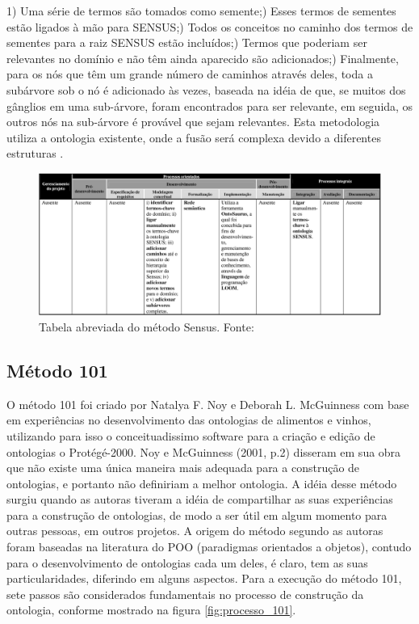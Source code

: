   1) Uma série de termos são tomados como semente;) Esses termos de sementes estão ligados à mão para SENSUS;) Todos os conceitos no caminho dos termos de sementes para a raiz SENSUS estão incluídos;) Termos que poderiam ser relevantes no domínio e não têm ainda aparecido são adicionados;) Finalmente, para os nós que têm um grande número de caminhos através deles,
  toda a subárvore sob o nó é adicionado às vezes, baseada na idéia de que, se muitos dos gânglios em uma sub-árvore,
  foram encontrados para ser relevante, em seguida, os outros nós na sub-árvore é provável que sejam relevantes.
  Esta metodologia utiliza a ontologia existente, onde a fusão será complexa devido a diferentes estruturas \cite{SeveralAuthorUFF2011}.

\begin{figure}[h] 
\centering 
\includegraphics[scale=0.4]{Figuras/10.png} 
\caption[Tabela abreviada do método Sensus]{Tabela abreviada do método Sensus. Fonte: \cite{DanielaLucas2008}}
\end{figure}

\subsection{Método 101} 
 O método 101 foi criado por  Natalya F. Noy e Deborah L. McGuinness com base em experiências no desenvolvimento
 das ontologias de alimentos e vinhos, utilizando para isso o conceituadissimo software para a criação e edição de
 ontologias o Protégé-2000. Noy e McGuinness (2001, p.2) disseram em sua obra que não existe uma única maneira mais
 adequada para a construção de ontologias, e portanto não definiriam a melhor ontologia. A idéia desse método surgiu
 quando as autoras tiveram a idéia de compartilhar  as suas experiências para a construção de ontologias, de modo a
 ser útil em algum momento para outras pessoas, em outros projetos. A origem do método segundo as autoras foram baseadas
 na literatura do POO (paradigmas orientados a objetos), contudo para o desenvolvimento de ontologias cada um deles, é
 claro, tem as suas particularidades, diferindo em alguns aspectos. \cite{VariosAutores2009} Para a execução do método 101,
 sete passos são considerados fundamentais no processo de construção da ontologia, conforme mostrado na figura \ref{fig:processo_101}.

